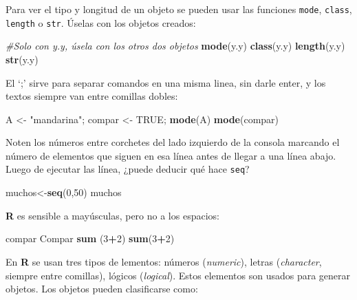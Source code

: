 \documentclass[
]{article}
\newenvironment{Shaded}{\begin{snugshade}}{\end{snugshade}}
\newcommand{\CommentTok}[1]{\textcolor[rgb]{0.56,0.35,0.01}{\textit{#1}}}
\newcommand{\DecValTok}[1]{\textcolor[rgb]{0.00,0.00,0.81}{#1}}
\newcommand{\KeywordTok}[1]{\textcolor[rgb]{0.13,0.29,0.53}{\textbf{#1}}}
\newcommand{\NormalTok}[1]{#1}
\newcommand{\OperatorTok}[1]{\textcolor[rgb]{0.81,0.36,0.00}{\textbf{#1}}}
\newcommand{\OtherTok}[1]{\textcolor[rgb]{0.56,0.35,0.01}{#1}}
\newcommand{\StringTok}[1]{\textcolor[rgb]{0.31,0.60,0.02}{#1}}
\begin{document}
Para ver el tipo y longitud de un objeto se pueden usar las funciones
\texttt{mode}, \texttt{class}, \texttt{length} o \texttt{str}. Úselas
con los objetos creados:

\begin{Shaded}
\begin{Highlighting}[]
\CommentTok{#Solo con y.y, úsela con los otros dos objetos}
\KeywordTok{mode}\NormalTok{(y.y)}
\KeywordTok{class}\NormalTok{(y.y)}
\KeywordTok{length}\NormalTok{(y.y)}
\KeywordTok{str}\NormalTok{(y.y)}
\end{Highlighting}
\end{Shaded}

El `;' sirve para separar comandos en una misma linea, sin darle enter,
y los textos siempre van entre comillas dobles:

\begin{Shaded}
\begin{Highlighting}[]
\NormalTok{A <-}\StringTok{ "mandarina"}\NormalTok{; compar <-}\StringTok{ }\OtherTok{TRUE}\NormalTok{; }\KeywordTok{mode}\NormalTok{(A)}
\KeywordTok{mode}\NormalTok{(compar)}
\end{Highlighting}
\end{Shaded}

Noten los números entre corchetes del lado izquierdo de la consola
marcando el número de elementos que siguen en esa línea antes de llegar
a una línea abajo. Luego de ejecutar las línea, ¿puede deducir qué hace
\texttt{seq}?

\begin{Shaded}
\begin{Highlighting}[]
\NormalTok{muchos<-}\KeywordTok{seq}\NormalTok{(}\DecValTok{0}\NormalTok{,}\DecValTok{50}\NormalTok{)}
\NormalTok{muchos}
\end{Highlighting}
\end{Shaded}

\textbf{R} es sensible a mayúsculas, pero no a los espacios:

\begin{Shaded}
\begin{Highlighting}[]
\NormalTok{compar}
\NormalTok{Compar}
\KeywordTok{sum}\NormalTok{    (}\DecValTok{3}\OperatorTok{+}\DecValTok{2}\NormalTok{)}
\KeywordTok{sum}\NormalTok{(}\DecValTok{3}\OperatorTok{+}\DecValTok{2}\NormalTok{)}
\end{Highlighting}
\end{Shaded}

En \textbf{R} se usan tres tipos de lementos: números (\emph{numeric}),
letras (\emph{character}, siempre entre comillas), lógicos
(\emph{logical}). Estos elementos son usados para generar objetos. Los
objetos pueden clasificarse como:
\end{document}
